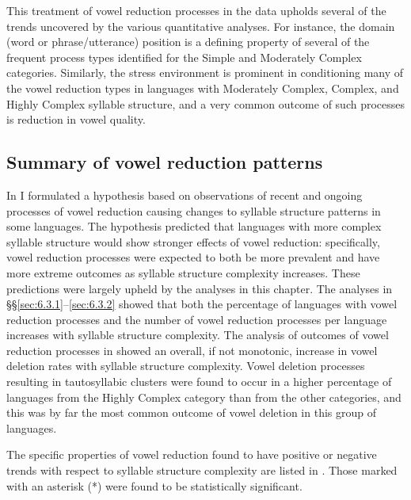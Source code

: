   This treatment of vowel reduction processes in the data upholds several of the trends uncovered by the various quantitative analyses. For instance, the domain (word or phrase/utterance) position is a defining property of several of the frequent process types identified for the Simple and Moderately Complex categories. Similarly, the stress environment is prominent in conditioning many of the vowel reduction types in languages with Moderately Complex, Complex, and Highly Complex syllable structure, and a very common outcome of such processes is reduction in vowel quality.

\subsection{Summary of vowel reduction patterns}\label{sec:6.3.7}

  In  I formulated a hypothesis based on observations of recent and ongoing processes of vowel reduction causing changes to syllable structure patterns in some languages. The hypothesis predicted that languages with more complex syllable structure would show stronger effects of vowel reduction: specifically, vowel reduction processes were expected to both be more prevalent and have more extreme outcomes as syllable structure complexity increases. These predictions were largely upheld by the analyses in this chapter. The analyses in §§\ref{sec:6.3.1}--\ref{sec:6.3.2} showed that both the percentage of languages with vowel reduction processes and the number of vowel reduction processes per language increases with syllable structure complexity. The analysis of outcomes of vowel reduction processes in  showed an overall, if not monotonic, increase in vowel deletion rates with syllable structure complexity. Vowel deletion processes resulting in tautosyllabic clusters were found to occur in a higher percentage of languages from the Highly Complex category than from the other categories, and this was by far the most common outcome of vowel deletion in this group of languages.

  The specific properties of vowel reduction found to have positive or negative trends with respect to syllable structure complexity are listed in . Those marked with an asterisk (*) were found to be statistically significant.

